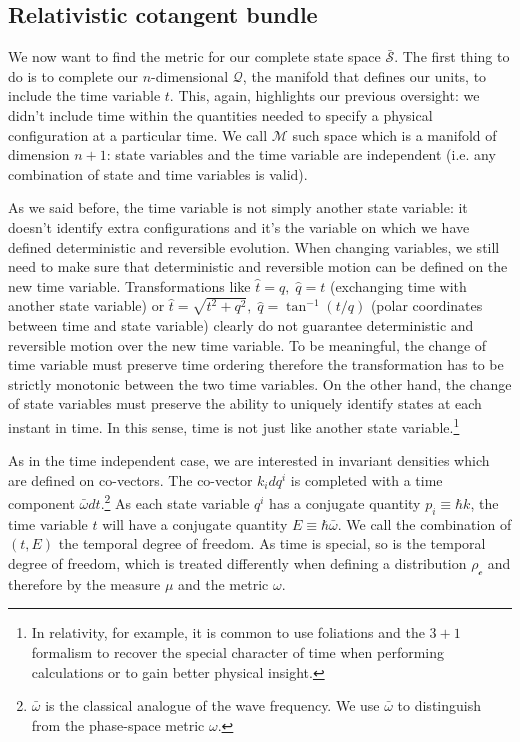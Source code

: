 \documentclass[aps,pra,10pt,twocolumn,floatfix,nofootinbib]{revtex4-1}
\numberwithin{equation}{section}
\theoremstyle{definition}
\begin{document}
\subsection{Relativistic cotangent bundle}

We now want to find the metric for our complete state space $\bar{\mathcal{S}}$. The first thing to do is to complete our $n$-dimensional $\mathcal{Q}$, the manifold that defines our units, to include the time variable $t$. This, again, highlights our previous oversight: we didn't include time within the quantities needed to specify a physical configuration at a particular time. We call $\mathcal{M}$ such space which is a manifold of dimension $n+1$: state variables and the time variable are independent (i.e. any combination of state and time variables is valid).

As we said before, the time variable is not simply another state variable: it doesn't identify extra configurations and it's the variable on which we have defined deterministic and reversible evolution. When changing variables, we still need to make sure that deterministic and reversible motion can be defined on the new time variable. Transformations like $\hat{t}=q, \; \hat{q}=t$ (exchanging time with another state variable) or $\hat{t}=\sqrt{t^2 + q^2}, \; \hat{q}=\tan^{-1}(t/q)$ (polar coordinates between time and state variable) clearly do not guarantee deterministic and reversible motion over the new time variable. To be meaningful, the change of time variable must preserve time ordering therefore the transformation has to be strictly monotonic between the two time variables. On the other hand, the change of state variables must preserve the ability to uniquely identify states at each instant in time. In this sense, time is not just like another state variable.\footnote{In relativity, for example, it is common to use foliations and the $3+1$ formalism to recover the special character of time when performing calculations or to gain better physical insight.}

As in the time independent case, we are interested in invariant densities which are defined on co-vectors. The co-vector $k_i dq^i$ is completed with a time component $\bar{\omega} dt$.\footnote{$\bar{\omega}$ is the classical analogue of the wave frequency. We use $\bar{\omega}$ to distinguish from the phase-space metric $\omega$.} As each state variable $q^i$ has a conjugate quantity $p_i\equiv \hbar k$, the time variable $t$ will have a conjugate quantity $E\equiv\hbar\bar{\omega}$. We call the combination of $(t, E)$ the temporal degree of freedom. As time is special, so is the temporal degree of freedom, which is treated differently when defining a distribution $\rho_\mathcal{c}$ and therefore by the measure $\mu$ and the metric $\omega$.
\end{document}
